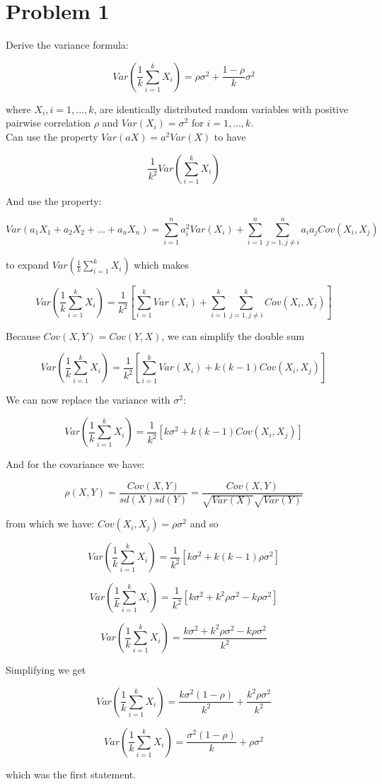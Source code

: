 \section*{Problem 1}

Derive the variance formula: 

\[ Var(\frac{1}{k} \sum\limits_{i=1}^k X_i ) = \rho\sigma^2 + \frac{1 - \rho}{k}\sigma^2 \]

where $X_i , i = 1,...,k$, are identically distributed random variables with positive pairwise correlation $\rho$ and $Var(X_i) = \sigma^2 $ for $ i = 1,...,k$. \\


\noindent Can use the property $Var(aX) = a^2Var(X)$ to have

\[ \frac{1}{k^2}Var(\sum\limits_{i=1}^k X_i) \]


\noindent And use the property: 

\[ Var(a_1X_1 + a_2X_2 + ... + a_nX_n) = \sum_{i=1}^{n} a_i^2Var(X_i) + \sum_{i=1}^{n}\sum_{j=1, j \neq i}^{n}a_i a_j Cov(X_i, X_j) \]

\noindent to expand $Var(\frac{1}{k} \sum_{i=1}^{k} X_i )$ which makes

\[ Var(\frac{1}{k} \sum\limits_{i=1}^k X_i ) = \frac{1}{k^2}[ \sum\limits_{i=1}^kVar(X_i) + \sum\limits_{i=1}^k \sum\limits_{j=1, j \neq i}^k Cov(X_i, X_j)]  \]


\noindent Because $Cov(X,Y) = Cov(Y,X)$, we can simplify the double sum 

\[ Var(\frac{1}{k} \sum\limits_{i=1}^k X_i ) = \frac{1}{k^2}[ \sum\limits_{i=1}^kVar(X_i) + k(k - 1) Cov(X_i, X_j)] \]

\noindent We can now replace the variance with $\sigma^2$:
 
\[ Var(\frac{1}{k} \sum\limits_{i=1}^k X_i ) = \frac{1}{k^2}[ k\sigma^2 + k(k - 1) Cov(X_i, X_j)] \] 


\noindent And for the covariance we have: 

\[ \rho(X,Y) = \frac{Cov(X,Y)}{sd(X) sd(Y)} = \frac{Cov(X,Y)}{\sqrt{Var(X)} \sqrt{Var(Y)}} \]

\noindent from which we have: $Cov(X_i, X_j) = \rho\sigma^2$ and so

\[ Var(\frac{1}{k} \sum\limits_{i=1}^k X_i ) = \frac{1}{k^2}[ k\sigma^2 + k(k - 1)\rho\sigma^2] \]

\[ Var(\frac{1}{k} \sum\limits_{i=1}^k X_i ) = \frac{1}{k^2}[ k\sigma^2 + k^2\rho\sigma^2 - k\rho\sigma^2] \]

\[ Var(\frac{1}{k} \sum\limits_{i=1}^k X_i ) = \frac{k\sigma^2 + k^2\rho\sigma^2 - k\rho\sigma^2}{k^2} \]


\noindent Simplifying we get

\[ Var(\frac{1}{k} \sum\limits_{i=1}^k X_i ) = \frac{k\sigma^2(1-\rho)}{k^2} + \frac{k^2\rho\sigma^2}{k^2} \]

\[ Var(\frac{1}{k} \sum\limits_{i=1}^k X_i ) = \frac{\sigma^2(1-\rho)}{k} + \rho\sigma^2 \]

\noindent which was the first statement. 







